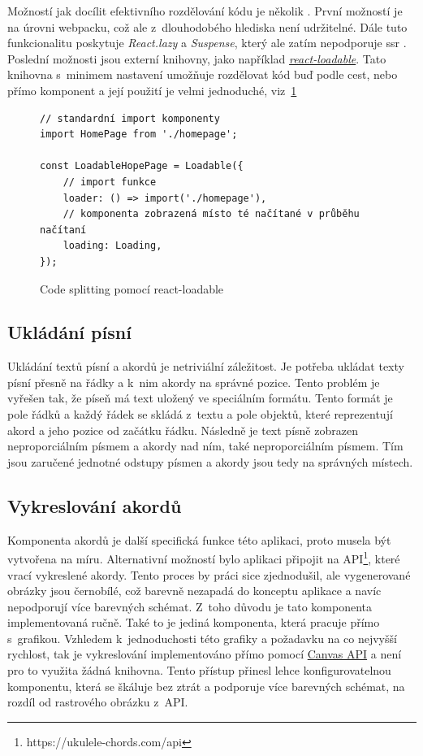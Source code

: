 Možností jak docílit efektivního rozdělování kódu je několik \cite{facebookinc_2018_codesplitting}. První možností je na úrovni webpacku, což ale z~dlouhodobého hlediska není udržitelné. Dále tuto funkcionalitu poskytuje \emph{React.lazy} a \emph{Suspense}, který ale zatím nepodporuje \acrshort{ssr} \cite{facebookinc_2018_codesplitting}. Poslední možnosti jsou externí knihovny, jako například \href{https://github.com/jamiebuilds/react-loadable}{\emph{react-loadable}}. Tato knihovna s~minimem nastavení umožňuje rozdělovat kód buď podle cest, nebo přímo komponent a její použití je velmi jednoduché, viz~\ref{code:code_splitting}

\begin{figure}[h!]
    \centering
    \begin{verbatim}
// standardní import komponenty
import HomePage from './homepage';

const LoadableHopePage = Loadable({
    // import funkce
    loader: () => import('./homepage'),
    // komponenta zobrazená místo té načítané v průběhu načítaní
    loading: Loading,
});
    \end{verbatim}
    \caption{Code splitting pomocí react-loadable}
    \label{code:code_splitting}
\end{figure}

\subsection{Ukládání písní}
\label{ss:song_saving}
Ukládání textů písní a akordů je netriviální záležitost. Je potřeba ukládat texty písní přesně na řádky a k~nim akordy na správné pozice. Tento problém je vyřešen tak, že píseň má text uložený ve speciálním formátu. Tento formát je pole řádků a každý řádek se skládá z~textu a pole objektů, které reprezentují akord a jeho pozice od začátku řádku. Následně je text písně zobrazen neproporciálním písmem a akordy nad ním, také neproporciálním písmem. Tím jsou zaručené jednotné odstupy písmen a akordy jsou tedy na správných místech.

\subsection{Vykreslování akordů}
\label{ss:chords_render}
Komponenta akordů je další specifická funkce této aplikaci, proto musela být vytvořena na míru. Alternativní možností bylo aplikaci připojit na API\footnote{https://ukulele-chords.com/api}, které vrací vykreslené akordy. Tento proces by práci sice zjednodušil, ale vygenerované obrázky jsou černobílé, což barevně nezapadá do konceptu aplikace a navíc nepodporují více barevných schémat. Z~toho důvodu je tato komponenta implementovaná ručně. Také to je jediná komponenta, která pracuje přímo s~grafikou. Vzhledem k~jednoduchosti této grafiky a požadavku na co nejvyšší rychlost, tak je vykreslování implementováno přímo pomocí \href{https://developer.mozilla.org/en-US/docs/Web/API/Canvas_API}{Canvas API} a není pro to využita žádná knihovna. Tento přístup přinesl lehce konfigurovatelnou komponentu, která se škáluje bez ztrát a podporuje více barevných schémat, na rozdíl od rastrového obrázku z~API.

